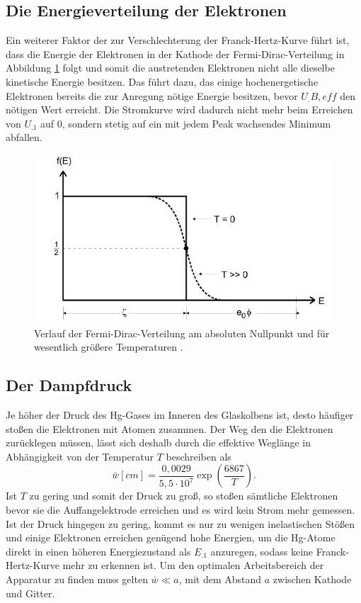 \subsection{Die Energieverteilung der Elektronen}
Ein weiterer Faktor der zur Verschlechterung der Franck-Hertz-Kurve führt ist, dass die Energie der Elektronen in der Kathode der Fermi-Dirac-Verteilung in Abbildung \ref{fig:fermi} folgt und somit die austretenden Elektronen nicht alle dieselbe kinetische Energie besitzen. Das führt dazu, das einige hochenergetische Elektronen bereits die zur Anregung nötige Energie besitzen, bevor $U_.{B,eff}$ den nötigen Wert erreicht. Die Stromkurve wird dadurch nicht mehr beim Erreichen von $U_.1$ auf 0, sondern stetig auf ein mit jedem Peak wachsendes Minimum abfallen.
\begin{figure}
\centering
\includegraphics[width=\linewidth-70pt,height=\textheight-70pt,keepaspectratio]{content/images/fermi.jpg}
\caption{Verlauf der Fermi-Dirac-Verteilung am absoluten Nullpunkt und für wesentlich größere Temperaturen \cite{V504}.\label{fig:fermi}}
\end{figure}
\subsection{Der Dampfdruck}
Je höher der Druck des Hg-Gases im Inneren des Glaskolbens ist, desto häufiger stoßen die Elektronen mit Atomen zusammen. Der Weg den die Elektronen zurücklegen müssen, lässt sich deshalb durch die effektive Weglänge in Abhängigkeit von der Temperatur $T$ beschreiben als
\begin{equation}
\bar{w}[cm]=\frac{0,0029}{5,5\cdot10^7}\exp{\left(\frac{6867}{T}\right)}\text{.}\label{eq:w}
\end{equation}
Ist $T$ zu gering und somit der Druck zu groß, so stoßen sämtliche Elektronen bevor sie die Auffangelektrode erreichen und es wird kein Strom mehr gemessen. Ist der Druck hingegen zu gering, kommt es nur zu wenigen inelastischen Stößen und einige Elektronen erreichen genügend hohe Energien, um die Hg-Atome direkt in einen höheren Energiezustand als $E_.1$ anzuregen, sodass keine Franck-Hertz-Kurve mehr zu erkennen ist.
Um den optimalen Arbeitsbereich der Apparatur zu finden muss gelten $\bar{w}\ll a$, mit dem Abstand $a$ zwischen Kathode und Gitter.